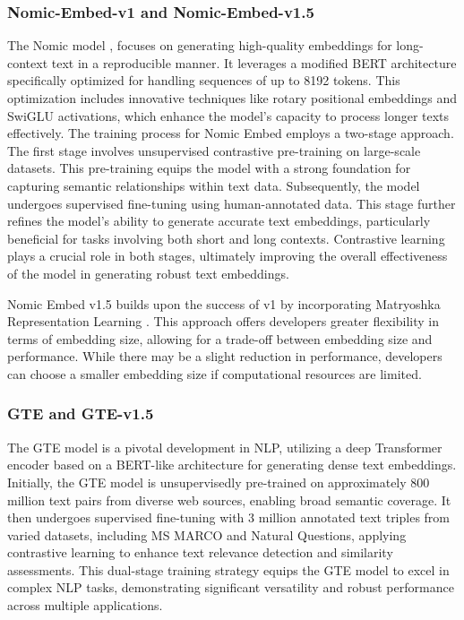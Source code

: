 \subsubsection{Nomic-Embed-v1 and Nomic-Embed-v1.5} \label{model:nomic-embed}
The Nomic model \cite{nussbaum2024nomic}, focuses on generating high-quality embeddings for long-context text in a reproducible manner.
It leverages a modified \ac{BERT} architecture specifically optimized for handling sequences of up to 8192 tokens.
This optimization includes innovative techniques like rotary positional embeddings and SwiGLU activations, which enhance the model's capacity to process longer texts effectively.
The training process for Nomic Embed employs a two-stage approach.
The first stage involves unsupervised contrastive pre-training on large-scale datasets.
This pre-training equips the model with a strong foundation for capturing semantic relationships within text data.
Subsequently, the model undergoes supervised fine-tuning using human-annotated data.
This stage further refines the model's ability to generate accurate text embeddings, particularly beneficial for tasks involving both short and long contexts.
Contrastive learning plays a crucial role in both stages, ultimately improving the overall effectiveness of the model in generating robust text embeddings.

Nomic Embed v1.5 builds upon the success of v1 by incorporating Matryoshka Representation Learning \cite{kusupati2024matryoshka}.
This approach offers developers greater flexibility in terms of embedding size, allowing for a trade-off between embedding size and performance.
While there may be a slight reduction in performance, developers can choose a smaller embedding size if computational resources are limited.

\subsubsection{\ac{GTE} and \ac{GTE}-v1.5} \label{model:gte}
The \ac{GTE} model is a pivotal development in \ac{NLP}, utilizing a deep Transformer encoder based on a \ac{BERT}-like architecture for generating dense text embeddings.
Initially, the \ac{GTE} model is unsupervisedly pre-trained on approximately 800 million text pairs from diverse web sources, enabling broad semantic coverage.
It then undergoes supervised fine-tuning with 3 million annotated text triples from varied datasets, including MS MARCO and Natural Questions, applying contrastive learning to enhance text relevance detection and similarity assessments.
This dual-stage training strategy equips the \ac{GTE} model to excel in complex \ac{NLP} tasks, demonstrating significant versatility and robust performance across multiple applications.

